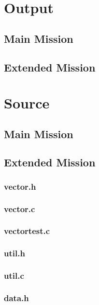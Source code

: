 \documentclass[a4paper, twoside]{article}
\begin{document}
\newpage
\section{Output}
\subsection{Main Mission}

\newpage
\subsection{Extended Mission}


\newpage
\section{Source}
\subsection{Main Mission}

\newpage
\subsection{Extended Mission}
\subsubsection{vector.h}

\subsubsection{vector.c}

\subsubsection{vectortest.c}

\subsubsection{util.h}

\subsubsection{util.c}

\subsubsection{data.h}

\end{document}
